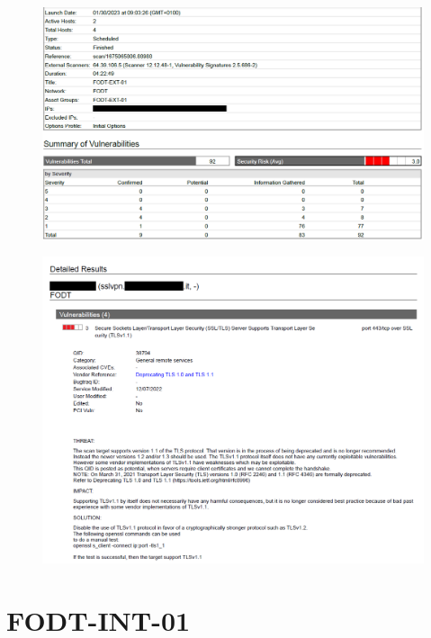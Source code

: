 \documentclass[target=bach,aauheader=]{thud}
\begin{document}
\begin{figure}[h]
    \centering
    \includegraphics[width=1\linewidth]{images/FODT-EXT-01_1.png}
    \caption{}
    \label{fig:fodt-ext-01_1}
\end{figure}

\pagebreak

\begin{figure}[h]
    \centering
    \includegraphics[width=1\linewidth]{images/FODT-EXT-01_2.png}
    \caption{}
    \label{fig:fodt-ext-01_2}
\end{figure}

\pagebreak

\section{FODT-INT-01}
\end{document}
